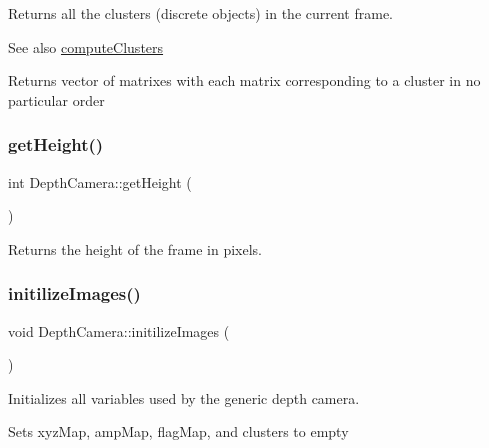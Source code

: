 Returns all the clusters (discrete objects) in the current frame. 

\begin{DoxySeeAlso}{See also}
\hyperlink{class_depth_camera_a009719ec313de883b617903360bdf519}{compute\+Clusters} 
\end{DoxySeeAlso}
\begin{DoxyReturn}{Returns}
vector of matrixes with each matrix corresponding to a cluster in no particular order 
\end{DoxyReturn}
\hypertarget{class_depth_camera_a430070d82a2bfc2583fd8290ca7bb8d6}{}\label{class_depth_camera_a430070d82a2bfc2583fd8290ca7bb8d6} 
\subsubsection{\texorpdfstring{get\+Height()}{getHeight()}}
{\footnotesize\ttfamily int Depth\+Camera\+::get\+Height (\begin{DoxyParamCaption}{ }\end{DoxyParamCaption})}



Returns the height of the frame in pixels. 

\hypertarget{class_depth_camera_a02f2fbde7cf4a340ace92278c89c66ef}{}\label{class_depth_camera_a02f2fbde7cf4a340ace92278c89c66ef} 
\subsubsection{\texorpdfstring{initilize\+Images()}{initilizeImages()}}
{\footnotesize\ttfamily void Depth\+Camera\+::initilize\+Images (\begin{DoxyParamCaption}{ }\end{DoxyParamCaption})\hspace{0.3cm}{\ttfamily [protected]}}



Initializes all variables used by the generic depth camera. 

Sets xyz\+Map, amp\+Map, flag\+Map, and clusters to empty \hypertarget{class_depth_camera_a21cf887a447d2cdfda6ac907662c55fe}{}\label{class_depth_camera_a21cf887a447d2cdfda6ac907662c55fe} 
